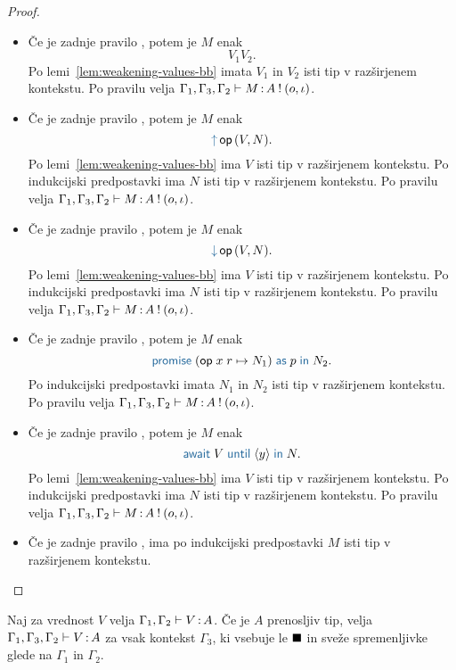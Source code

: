 \begin{proof}
\begin{itemize}
		\item Če je zadnje pravilo , potem je $M$ enak $$V_1 V_2.$$
		Po lemi~\ref{lem:weakening-values-bb} imata $V_1$ in $V_2$ isti tip v razširjenem kontekstu.
		Po pravilu  velja $\Gamma_1, \Gamma_3, \Gamma_2 \vdash M \mathinner{:} A \mathbin{!} (o, \iota)$.
		
		\item Če je zadnje pravilo , potem je $M$ enak $$\tmopout{op}{V}{N}.$$
		Po lemi~\ref{lem:weakening-values-bb} ima $V$ isti tip v razširjenem kontekstu.
		Po indukcijski predpostavki ima $N$ isti tip v razširjenem kontekstu.
		Po pravilu  velja $\Gamma_1, \Gamma_3, \Gamma_2 \vdash M \mathinner{:} A \mathbin{!} (o, \iota)$.
		
		\item Če je zadnje pravilo , potem je $M$ enak $$\tmopin{op}{V}{N}.$$
		Po lemi~\ref{lem:weakening-values-bb} ima $V$ isti tip v razširjenem kontekstu.
		Po indukcijski predpostavki ima $N$ isti tip v razširjenem kontekstu.
		Po pravilu  velja $\Gamma_1, \Gamma_3, \Gamma_2 \vdash M \mathinner{:} A \mathbin{!} (o, \iota)$.
		
		\item Če je zadnje pravilo , potem je $M$ enak $$\tmwithrec{op}{x}{r}{N_1}{p}{N_2}.$$
		Po indukcijski predpostavki imata $N_1$ in $N_2$ isti tip v razširjenem kontekstu.
		Po pravilu  velja $\Gamma_1, \Gamma_3, \Gamma_2 \vdash M \mathinner{:} A \mathbin{!} (o, \iota)$.
		
		\item Če je zadnje pravilo , potem je $M$ enak $$\tmawait{V}{y}{N}.$$
		Po lemi~\ref{lem:weakening-values-bb} ima $V$ isti tip v razširjenem kontekstu.
		Po indukcijski predpostavki ima $N$ isti tip v razširjenem kontekstu.
		Po pravilu  velja $\Gamma_1, \Gamma_3, \Gamma_2 \vdash M \mathinner{:} A \mathbin{!} (o, \iota)$.
		
		\item Če je zadnje pravilo , ima po indukcijski predpostavki $M$ isti tip v razširjenem kontekstu.
		
	\end{itemize}
\end{proof}


\begin{lema}\label{lem:weakening-values-prenosljiv}
	Naj za vrednost $V$ velja $\Gamma_1, \Gamma_2 \vdash V \mathinner{:} A$. Če je $A$ prenosljiv tip, velja $\Gamma_1, \Gamma_3, \Gamma_2 \vdash V \mathinner{:} A$ za vsak kontekst $\Gamma_3$, ki vsebuje le $\blacksquare$ in sveže spremenljivke glede na $\Gamma_1$ in $\Gamma_2$.
\end{lema}

